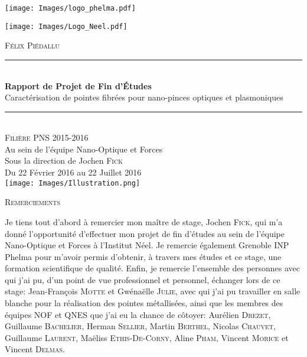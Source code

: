 \begin{titlepage}
    \vspace*{-10px}
    \texttt{[image: Images/logo\_phelma.pdf]}
    \vspace*{-80px}
\begin{flushright}
    \vspace*{-10px}
    \texttt{[image: Images/Logo\_Neel.pdf]}
\end{flushright}

\vspace*{1.5cm}
\begin{center}
\LARGE{\textsc{Félix Piédallu}}\\[1cm]

\rule{\linewidth}{0.5mm}\\[0.4cm]
{\huge{\bfseries Rapport de Projet de Fin d'Études}\\[0.4cm]
Caractérisation de pointes fibrées pour nano-pinces optiques et plasmoniques\\[0.4cm]}
\rule{\linewidth}{0.5mm}\\[0.5cm]

\large{\textsc{Filière PNS 2015-2016}}\\[2cm]

\Large{Au sein de l'équipe Nano-Optique et Forces}\\[1cm]

\Large{Sous la direction de Jochen \textsc{Fick}}\\[1cm]

\large{Du 22 Février 2016 au 22 Juillet 2016}\\[1cm]

\texttt{[image: Images/Illustration.png]}\\[0cm]


\end{center}
\end{titlepage}
\newpage\null\thispagestyle{empty}\newpage
\begin{center}
\textsc{\Large Remerciements}
\end{center}

\vspace{0.5cm}
Je tiens tout d'abord à remercier mon maître de stage, Jochen \textsc{Fick}, qui m'a donné l'opportunité d'effectuer mon projet de fin d'études au sein de l'équipe Nano-Optique et Forces à l'Institut Néel. Je remercie également Grenoble INP Phelma pour m'avoir permis d'obtenir, à travers mes études et ce stage, une formation scientifique de qualité.
Enfin, je remercie l'ensemble des personnes avec qui j'ai pu, d'un point de vue professionnel et personnel, échanger lors de ce stage: Jean-François \textsc{Motte} et Gwénaëlle \textsc{Julie}, avec qui j'ai pu travailler en salle blanche pour la réalisation des pointes métallisées, ainsi que les membres des équipes NOF et QNES que j'ai eu la chance de côtoyer: Aurélien \textsc{Drezet}, Guillaume \textsc{Bachelier}, Herman \textsc{Sellier}, Martin \textsc{Berthel}, Nicolas \textsc{Chauvet}, Guillaume \textsc{Laurent}, Maëliss \textsc{Ethis-De-Corny}, Aline \textsc{Pham}, Vincent \textsc{Morice} et Vincent \textsc{Delmas}.


\tableofcontents        %
\newpage
\listoffigures
{}  %
